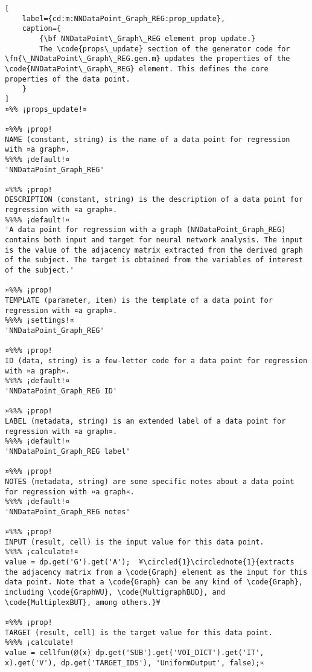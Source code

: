 \documentclass{tufte-handout}
\begin{document}
\begin{lstlisting}[
	label={cd:m:NNDataPoint_Graph_REG:prop_update},
	caption={
		{\bf NNDataPoint\_Graph\_REG element prop update.}
		The \code{props\_update} section of the generator code for \fn{\_NNDataPoint\_Graph\_REG.gen.m} updates the properties of the \code{NNDataPoint\_Graph\_REG} element. This defines the core properties of the data point.
	}
]
¤%% ¡props_update!¤

¤%%% ¡prop!
NAME (constant, string) is the name of a data point for regression with ¤a graph¤.
%%%% ¡default!¤
'NNDataPoint_Graph_REG'

¤%%% ¡prop!
DESCRIPTION (constant, string) is the description of a data point for regression with ¤a graph¤.
%%%% ¡default!¤
'A data point for regression with a graph (NNDataPoint_Graph_REG) contains both input and target for neural network analysis. The input is the value of the adjacency matrix extracted from the derived graph of the subject. The target is obtained from the variables of interest of the subject.'

¤%%% ¡prop!
TEMPLATE (parameter, item) is the template of a data point for regression with ¤a graph¤.
%%%% ¡settings!¤
'NNDataPoint_Graph_REG'

¤%%% ¡prop!
ID (data, string) is a few-letter code for a data point for regression with ¤a graph¤.
%%%% ¡default!¤
'NNDataPoint_Graph_REG ID'

¤%%% ¡prop!
LABEL (metadata, string) is an extended label of a data point for regression with ¤a graph¤.
%%%% ¡default!¤
'NNDataPoint_Graph_REG label'

¤%%% ¡prop!
NOTES (metadata, string) are some specific notes about a data point for regression with ¤a graph¤.
%%%% ¡default!¤
'NNDataPoint_Graph_REG notes'

¤%%% ¡prop!
INPUT (result, cell) is the input value for this data point.
%%%% ¡calculate!¤
value = dp.get('G').get('A');  ¥\circled{1}\circlednote{1}{extracts the adjacency matrix from a \code{Graph} element as the input for this data point. Note that a \code{Graph} can be any kind of \code{Graph}, including \code{GraphWU}, \code{MultigraphBUD}, and \code{MultiplexBUT}, among others.}¥
    
¤%%% ¡prop!
TARGET (result, cell) is the target value for this data point.
%%%% ¡calculate!
value = cellfun(@(x) dp.get('SUB').get('VOI_DICT').get('IT', x).get('V'), dp.get('TARGET_IDS'), 'UniformOutput', false);¤

\end{lstlisting}
\end{document}
